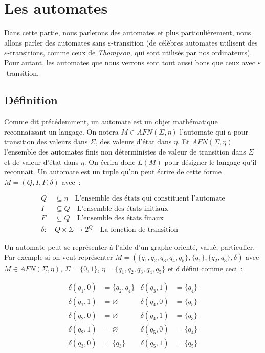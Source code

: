 \section{Les automates}

Dans cette partie, nous parlerons des automates et plus particulièrement, nous
allons parler des automates sans \(\varepsilon\)-transition (de célèbres
automates utilisent des \(\varepsilon\)-transitions, comme ceux de
\textit{Thompson}, qui sont utilisés par nos ordinateurs). Pour autant, les
automates que nous verrons sont tout aussi bons que ceux avec
\(\varepsilon\)-transition.

\subsection{Définition}

Comme dit précédemment, un automate est un objet mathématique reconnaissant un
langage. On notera \(M \in AFN(\Sigma, \eta)\) l'automate qui a pour transition
des valeurs dans \(\Sigma\), des valeurs \og{}d'état\fg{} dans \(\eta\). Et
\(AFN(\Sigma, \eta)\) l'ensemble des automates finis non déterministes de
valeur de transition dans \(\Sigma\) et de valeur d'état dans \(\eta\). On
écrira donc \(L(M)\) pour désigner le langage qu'il reconnait. Un automate est
un tuple qu'on peut écrire de cette forme \(M = (Q, I, F, \delta)\) avec~:

\begin{align*}
    Q & \subseteq \eta \quad \text{L'ensemble des états qui constituent
    l'automate}                                                                \\
    I & \subseteq Q \quad \text{L'ensemble des états initiaux}          \\
    F & \subseteq Q \quad \text{L'ensemble des états finaux}            \\
    \delta:~ & Q \times \Sigma \to 2^Q \quad \text{La fonction de transition}
\end{align*}

Un automate peut se représenter à l'aide d'un graphe orienté, valué,
particulier. Par exemple si on veut représenter \(M = (\{q_1, q_2, q_3, q_4,
q_5\}, \{q_1\},\{q_2, q_3\}, \delta)\) avec \(M \in AFN(\Sigma, \eta)\),
\(\Sigma = \{0, 1\}\), \(\eta = \{q_1, q_2, q_3, q_4, q_5\}\) et \(\delta\)
défini comme ceci~:

\begin{align*}
    \delta(q_1, 0) & = \{q_2, q_4\} & \delta(q_3, 1) & = \{q_4\} \\
    \delta(q_1, 1) & = \varnothing  & \delta(q_4, 0) & = \{q_5\} \\
    \delta(q_2, 0) & = \varnothing  & \delta(q_4, 1) & = \{q_3\} \\
    \delta(q_2, 1) & = \varnothing  & \delta(q_5, 0) & = \{q_4\} \\
    \delta(q_3, 0) & = \{q_3\}      & \delta(q_5, 1) & = \{q_5\} \\
\end{align*}

